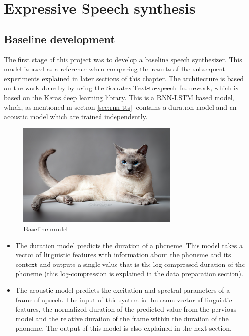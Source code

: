 \chapter{Expressive Speech synthesis}


\section{Baseline development}

The first stage of this project was to develop a baseline speech synthesizer. This model is used as a reference when comparing the results of the subsequent experiments explained in later sections of this chapter. The architecture is based on the work done by \cite{santi06} by using the Socrates Text-to-speech framework, which is based on the Keras deep learning library. This is a RNN-LSTM based model, which, as mentioned in section \ref{sec:rnn-tts}, contains a duration model and an acoustic model which are trained independently.

\begin{figure}[h]
    \centering
    \includegraphics[width=8cm]{figures/cat}
    \caption{Baseline model}
    \label{fig:lstm-tts}
\end{figure}

\begin{itemize}
    \item The duration model predicts the duration of a phoneme. This model takes a vector of linguistic features with information about the phoneme and its context and outputs a single value that is the log-compressed duration of the phoneme (this log-compression is explained in the data preparation section).
    \item The acoustic model predicts the excitation and spectral parameters of a frame of speech. The input of this system is the same vector of linguistic features, the normalized duration of the predicted value from the pervious model and the relative duration of the frame within the duration of the phoneme. The output of this model is also explained in the next section.
\end{itemize}

